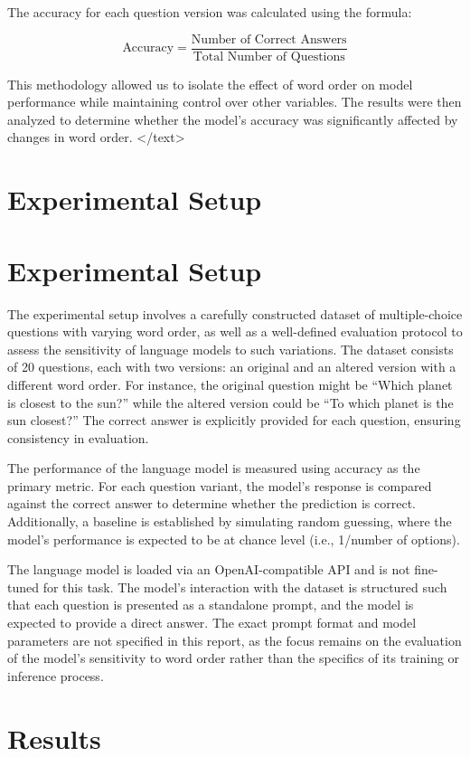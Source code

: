 \documentclass{article}
\begin{document}
The accuracy for each question version was calculated using the formula:

$$
\text{Accuracy} = \frac{\text{Number of Correct Answers}}{\text{Total Number of Questions}}
$$

This methodology allowed us to isolate the effect of word order on model performance while maintaining control over other variables. The results were then analyzed to determine whether the model’s accuracy was significantly affected by changes in word order.
</text>
\section{Experimental Setup}
\section{Experimental Setup}

The experimental setup involves a carefully constructed dataset of multiple-choice questions with varying word order, as well as a well-defined evaluation protocol to assess the sensitivity of language models to such variations. The dataset consists of 20 questions, each with two versions: an original and an altered version with a different word order. For instance, the original question might be ``Which planet is closest to the sun?'' while the altered version could be ``To which planet is the sun closest?'' The correct answer is explicitly provided for each question, ensuring consistency in evaluation.

The performance of the language model is measured using accuracy as the primary metric. For each question variant, the model's response is compared against the correct answer to determine whether the prediction is correct. Additionally, a baseline is established by simulating random guessing, where the model's performance is expected to be at chance level (i.e., 1/number of options). 

The language model is loaded via an OpenAI-compatible API and is not fine-tuned for this task. The model's interaction with the dataset is structured such that each question is presented as a standalone prompt, and the model is expected to provide a direct answer. The exact prompt format and model parameters are not specified in this report, as the focus remains on the evaluation of the model's sensitivity to word order rather than the specifics of its training or inference process.
\section{Results}
\end{document}
